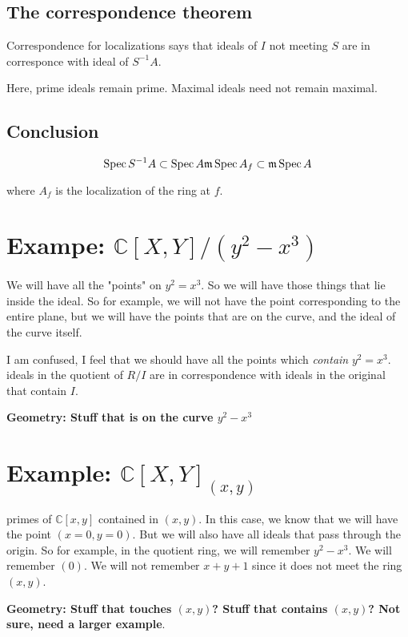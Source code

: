 \documentclass{book}
\newcommand{\C}{\ensuremath{\mathbb{C}}}
\newcommand{\spec}{\operatorname{Spec}}
\newcommand{\m}{\mathfrak{m}}
\newcommand{\mspec}{\m\operatorname{Spec}}
\theoremstyle{definition}
\begin{document}
\subsection{The correspondence theorem}
Correspondence
for localizations says that
ideals of $I$ not meeting $S$ are in corresponce with ideal of $S^{-1}A$.

Here, prime ideals remain prime. Maximal ideals need not remain maximal.

\subsection{Conclusion}

$$
\spec S^{-1} A \subset \spec A \\
\mspec A_f \subset \mspec A \\
$$

where $A_f$ is the localization of the ring at $f$.

\section{Exampe: $\C[X, Y]/(y^2 - x^3)$}

We will have all the "points" on $y^2 = x^3$. So we will have those things
that lie inside the ideal. So for example, we will not have the point
corresponding to the entire plane, but we will have the points that are
on the curve, and the ideal of the curve itself.

I am confused, I feel that we should have all the points which \emph{contain} $y^2 = x^3$.
ideals in the quotient of $R/I$ are in correspondence with ideals in the original that
contain $I$.

\textbf{Geometry: Stuff that is on the curve $y^2 - x^3$}


\section{Example: $\C[X, Y]_(x, y)$}

primes of $\C[x, y]$ contained in $(x, y)$. In this case, we know that we will
have the point $(x=0, y=0)$. But we will also have all ideals that pass through
the origin. So for example, in the quotient ring, we will remember $y^2 - x^3$.
We will remember $(0)$. We will not remember $x + y + 1$ since it does not
meet the ring $(x, y)$.


\textbf{Geometry: Stuff that touches $(x, y)$? Stuff that contains $(x, y)$? Not sure, need a larger example}.
\end{document}
